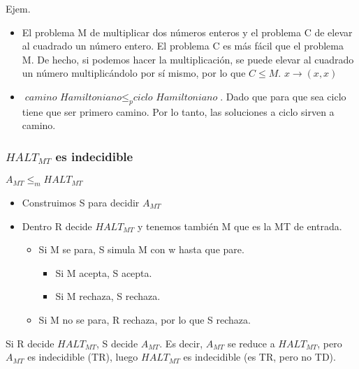Ejem. 
\begin{itemize}
    \item El problema M de multiplicar dos números enteros y el problema C de elevar al cuadrado un número entero. El problema C es más fácil que el problema M. De hecho, si podemos hacer la multiplicación, se puede elevar al cuadrado un número multiplicándolo por sí mismo, por lo que $C \leq M$. $x \rightarrow (x,x)$
    \item $\textit{camino Hamiltoniano} \leq_p \textit{ciclo Hamiltoniano}$. Dado que para que sea ciclo tiene que ser primero camino. Por lo tanto, las soluciones a ciclo sirven a camino.
\end{itemize} 

\subsubsection{$HALT_{MT}$ es indecidible}
$A_{MT} \leq_m HALT_{MT}$
\begin{itemize}
    \item Construimos S para decidir $A_{MT}$
    \item Dentro R decide $HALT_{MT}$ y tenemos también M que es la MT de entrada. 
    \begin{itemize}
        \item Si M se para, S simula M con w hasta que pare.
        \begin{itemize}
            \item Si M acepta, S acepta.
            \item Si M rechaza, S rechaza.
        \end{itemize}
        \item Si M no se para, R rechaza, por lo que S rechaza.
    \end{itemize}  
\end{itemize}

Si R decide $HALT_{MT}$, S decide $A_{MT}$. Es decir, $A_{MT}$ se reduce a $HALT_{MT}$, pero $A_{MT}$ es indecidible (TR), luego $HALT_{MT}$ es indecidible (es TR, pero no TD).
